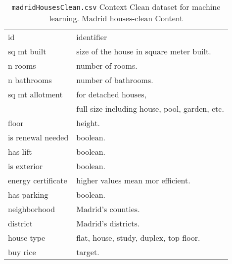 \documentclass[12pt]{article}
\theoremstyle{remark}
\begin{document}
\begin{table}
	\caption{ \texttt{madridHousesClean.csv}
Context
Clean dataset for machine learning.
\href{https://www.kaggle.com/datasets/makofe/housesclean}{Madrid houses-clean} Content
}
	\begin{tabular}{l|l}\hline
id & identifier\\
sq mt built  & size of the house in square meter built.\\
n rooms & number of rooms.\\
n bathrooms & number of bathrooms. \\
sq mt allotment& for detached houses,\\
& full size including house, pool, garden, etc.\\
floor & height.\\
is renewal needed &  boolean.\\
has lift & boolean.\\
is exterior & boolean.\\
energy certificate & higher values mean mor efficient.\\
has parking & boolean.\\
neighborhood & Madrid's counties.\\
district & Madrid's districts.\\
house type & flat, house, study, duplex, top floor.\\
buy rice & target.\\
	\hline
	\end{tabular}
\end{table}
\end{document}
